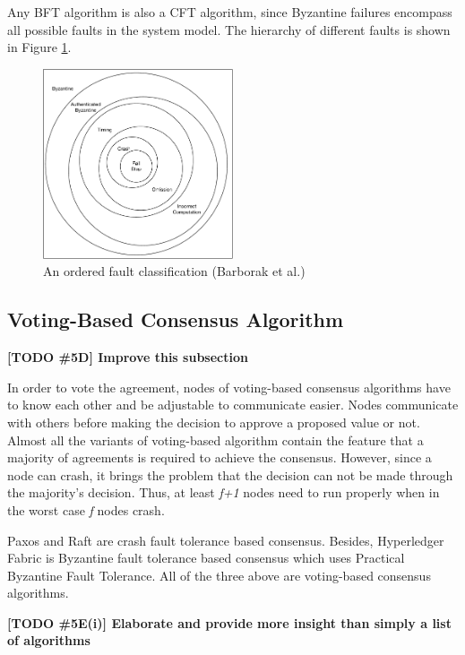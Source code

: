 \documentclass[12pt, a4paper]{article}
\newcommand{\todo}[2]{\textbf{\color{blue}[TODO \##1] #2}\par}
\begin{document}
Any BFT algorithm is also a CFT algorithm, since Byzantine failures encompass all possible faults in the system model. The hierarchy of different faults \cite{barborak1993consensus} is shown in Figure \ref{fig:aofc}.

\begin{figure}[htp]
  \centering
  \includegraphics[width=0.5\textwidth]{img/AOFC.pdf}
  \caption{An ordered fault classification (Barborak et al.)}
  \label{fig:aofc}
\end{figure}

\subsection{Voting-Based Consensus Algorithm}
\todo{5D}{Improve this subsection}
In order to vote the agreement, nodes of voting-based consensus algorithms have to know each other and be adjustable to communicate easier\cite{nguyen2018survey}. Nodes communicate with others before making the decision to approve a proposed value or not. Almost all the variants of voting-based algorithm contain the feature that a majority of agreements is required to achieve the consensus. However, since a node can crash, it brings the problem that the decision can not be made through the majority's decision. Thus, at least \textit{f+1} nodes need to run properly when in the worst case \textit{f} nodes crash.

Paxos\cite{lamport2001paxos} and Raft\cite{conf/usenix/OngaroO14} are crash fault tolerance based consensus. Besides, Hyperledger Fabric\cite{cachin2016architecture} is Byzantine fault tolerance based consensus which uses Practical Byzantine Fault Tolerance\cite{castro1999practical}. All of the three above are voting-based consensus algorithms.

\todo{5E(i)}{Elaborate and provide more insight than simply a list of algorithms}
\end{document}
